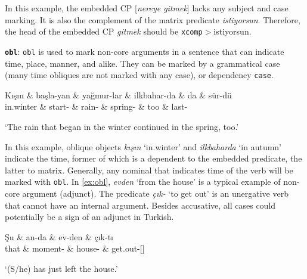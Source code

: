 \documentclass[11pt,a4paper]{article}
\begin{document}
In this example, the embedded CP [\textit{nereye gitmek}] lacks any subject and case marking. It is also the complement of the matrix predicate \textit{istiyorsun}. Therefore, the head of the embedded CP \textit{gitmek} should be \texttt{xcomp}$>$istiyorsun.

\textbf{\texttt{obl}}:
\texttt{obl} is used to mark non-core arguments in a sentence that can indicate time, place, manner, and alike. They can be marked by a grammatical case (many time obliques are not marked with any case), or dependency \texttt{case}. 

\begin{exe}
\ex \label{xcomp2}
\begin{dependency}
\begin{deptext}[column sep=0.31cm]
Kışın \& başla-yan \& yağmur-lar \& ilkbahar-da \& da \& sür-dü \\
in.winter \& start-\Ptcp{} \& rain-\Pl{} \& spring-\Loc{} \& too \& last-\Pst{} \\
\end{deptext}
\end{dependency}
\glt `The rain that began in the winter continued in the spring, too.'
\end{exe} 
In this example, oblique objects \textit{kışın} `in.winter' and \textit{ilkbaharda} `in autumn' indicate the time, former of which is a dependent to the embedded predicate, the latter to matrix. Generally, any nominal that indicates time of the verb will be marked with \texttt{obl}. In \autoref{ex:obl}, \textit{evden} `from the house' is a typical example of non-core argument (adjunct). The predicate \textit{çık-} `to get out' is an unergative verb that cannot have an internal argument. Besides accusative, all cases could potentially be a sign of an adjunct in Turkish.

\begin{exe}
\ex \label{ex:obl}
\begin{dependency}
\begin{deptext}[column sep=0.3cm]
Şu \& an-da \& ev-den \& çık-tı \\
that \& moment-\Loc{} \& house-\Abl{} \& get.out-\Pst{}[\Tsg]\\
\end{deptext}
\end{dependency}
\glt `(S/he) has just left the house.'
\end{exe} 
\end{document}

